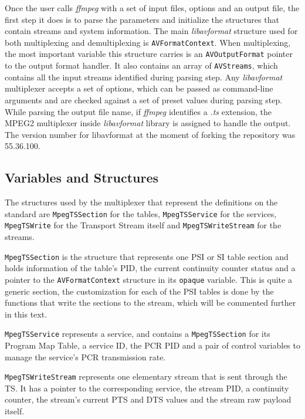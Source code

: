 \documentclass[
	12pt,				%
	openright,			%
	twoside,			%
	a4paper,			%
	brazil,
	french,				%
	english
	]{abntex2}
\begin{document}
Once the user calls \textit{ffmpeg} with a set of input files, options and an output file, the first step it does is to parse the parameters and initialize the structures that contain streams and system information. The main \textit{libavformat} structure used for both multiplexing and demultiplexing is \texttt{AVFormatContext}. When multiplexing, the most important variable this structure carries is an \texttt{AVOutputFormat} pointer to the output format handler. It also contains an array of \texttt{AVStreams}, which contains all the input streams identified during parsing step. Any \textit{libavformat} multiplexer accepts a set of options, which can be passed as command-line arguments and are checked against a set of preset values during parsing step. While parsing the output file name, if \textit{ffmpeg} identifies a \textit{.ts} extension, the MPEG2 multiplexer inside \textit{libavformat} library is assigned to handle the output. The version number for libavformat at the moment of forking the repository was 55.36.100.

\subsection{Variables and Structures}

The structures used by the multiplexer that represent the definitions on the standard are \texttt{MpegTSSection} for the tables, \texttt{MpegTSService} for the services, \texttt{MpegTSWrite} for the Transport Stream itself and \texttt{MpegTSWriteStream} for the streams.

\texttt{MpegTSSection} is the structure that represents one PSI or SI table section and holds information of the table's PID, the current continuity counter status and a pointer to the \texttt{AVFormatContext} structure in its \texttt{opaque} variable. This is quite a generic section, the customization for each of the PSI tables is done by the functions that write the sections to the stream, which will be commented further in this text.

\texttt{MpegTSService} represents a service, and contains a \texttt{MpegTSSection} for its Program Map Table, a service ID, the PCR PID and a pair of control variables to manage the service's PCR transmission rate.

\texttt{MpegTSWriteStream} represents one elementary stream that is sent through the TS. It has a pointer to the corresponding service, the stream PID, a continuity counter, the stream's current PTS and DTS values and the stream raw payload itself.
\end{document}
